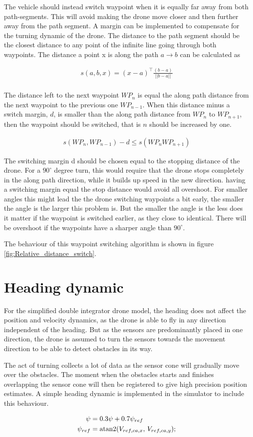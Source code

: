 The vehicle should instead switch waypoint when it is equally far away from both path-segments. This will avoid making the drone move closer and then further away from the path segment. A margin can be implemented to compensate for the turning dynamic of the drone. The distance to the path segment should be the closest distance to any point of the infinite line going through both waypoints. The distance a point x is along the path $a \rightarrow b$ can be calculated as

\begin{align}
    s(a, b, x) = (x-a)^\top \frac{(b-a)}{||b-a||} \\
\end{align}

The distance left to the next waypoint $WP_n$ is equal the along path distance from the next waypoint to the previous one $WP_{n-1}$. When this distance minus a switch margin, $d$, is smaller than the along path distance from $WP_n$ to $WP_{n+1}$, then the waypoint should be switched, that is $n$ should be increased by one. 

\begin{align}
    s(WP_n, WP_{n-1}) - d \leq s(WP_n WP_{n+1})
\end{align}

The switching margin d should be chosen equal to the stopping distance of the drone. For a $90^\circ$ degree turn, this would require that the drone stops completely in the along path direction, while it builds up speed in the new direction. having a switching margin equal the stop distance would avoid all overshoot. For smaller angles this might lead the the drone switching waypoints a bit early, the smaller the angle is the larger this problem is. But the smaller the angle is the less does it matter if the waypoint is switched earlier, as they close to identical. There will be overshoot if the waypoints have a sharper angle than  $90^\circ$.

The behaviour of this waypoint switching algorithm is shown in figure \ref{fig:Relative_distance_switch}.

\section{Heading dynamic}
For the simplified double integrator drone model, the heading does not affect the position and velocity dynamics, as the drone is able to fly in any direction independent of the heading. But as the sensors are predominantly placed in one direction, the drone is assumed to turn the sensors towards the movement direction to be able to detect obstacles in its way. 

The act of turning collects a lot of data as the sensor cone will gradually move over the obstacles. The moment when the obstacles starts and finishes overlapping the sensor cone will then be registered to give high precision position estimates. A simple heading dynamic is implemented in the simulator to include this behaviour. 

\begin{align}
    \psi &= 0.3 \psi + 0.7 \psi_{ref} \\
    \psi_{ref} &= \textnormal{atan2}(V_{ref,ca,x}, \, V_{ref,ca,y});
\end{align}
